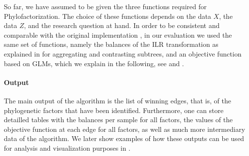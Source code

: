 So far, we have assumed to be given the three functions required for Phylofactorization.
The choice of these functions depends on the data $X$, the data $Z$, and the research question at hand.
In order to be consistent and comparable with the original implementation \cite{Washburne2017a},
in our evaluation we used the same set of functions,
namely the balances of the ILR transformation as explained in  for aggregating and contrasting subtrees,
and an objective function based on \acfp{GLM}, 
which we explain in the following, 
see  and .


\paragraph{Output}
\label{ch:Factorization:sec:Methods:sub:Phylofactor:par:Output}

The main output of the algorithm is the list of winning edges, that is, 
of the phylogenetic factors that have been identified.
Furthermore, one can store detailled tables with the balances per sample for all factors,
the values of the objective function at each edge for all factors,
as well as much more intermediary data of the algorithm.
We later show examples of how these outputs can be used for analysis and visualization purposes
in .


